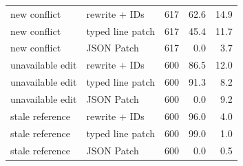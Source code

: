 \begin{tabular}{llrrr}
new conflict & rewrite + IDs & 617 & 62.6 & 14.9 \\
new conflict & typed line patch & 617 & 45.4 & 11.7 \\
new conflict & JSON Patch & 617 & 0.0 & 3.7 \\
unavailable edit & rewrite + IDs & 600 & 86.5 & 12.0 \\
unavailable edit & typed line patch & 600 & 91.3 & 8.2 \\
unavailable edit & JSON Patch & 600 & 0.0 & 9.2 \\
stale reference & rewrite + IDs & 600 & 96.0 & 4.0 \\
stale reference & typed line patch & 600 & 99.0 & 1.0 \\
stale reference & JSON Patch & 600 & 0.0 & 0.5 \\
\bottomrule
\end{tabular}

